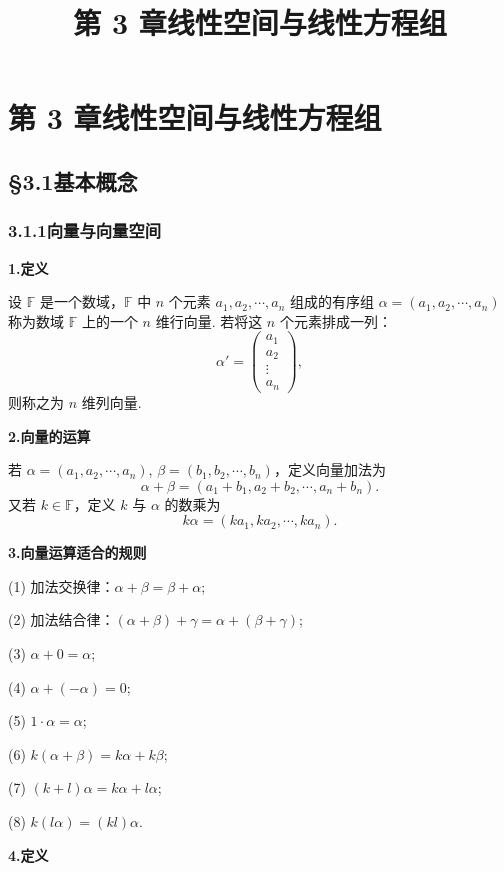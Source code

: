 \documentclass[UTF8,12pt,a4paper,fontset=fandol]{ctexart}
\title{第 3 章\quad 线性空间与线性方程组}
\author{}
\date{}
\begin{document}
\maketitle

\section*{第 3 章\quad 线性空间与线性方程组}

\subsection*{§3.1\quad 基本概念}

\subsubsection*{3.1.1\quad 向量与向量空间}

\noindent\textbf{1.\quad 定义}

设 $\mathbb{F}$ 是一个数域，$\mathbb{F}$ 中 $n$ 个元素 $a_1,a_2,\cdots,a_n$ 组成的有序组
$\alpha=(a_1,a_2,\cdots,a_n)$ 称为数域 $\mathbb{F}$ 上的一个 $n$ 维行向量. 若将这 $n$ 个元素排成一列：
\[
\alpha'=
\begin{pmatrix}
a_1\\
a_2\\
\vdots\\
a_n
\end{pmatrix},
\]
则称之为 $n$ 维列向量.

\noindent\textbf{2.\quad 向量的运算}

若 $\alpha=(a_1,a_2,\cdots,a_n)$, $\beta=(b_1,b_2,\cdots,b_n)$，定义向量加法为
\[
\alpha+\beta=(a_1+b_1,a_2+b_2,\cdots,a_n+b_n).
\]
又若 $k\in\mathbb{F}$，定义 $k$ 与 $\alpha$ 的数乘为
\[
k\alpha=(ka_1,ka_2,\cdots,ka_n).
\]

\noindent\textbf{3.\quad 向量运算适合的规则}

(1) 加法交换律：$\alpha+\beta=\beta+\alpha$;

(2) 加法结合律：$(\alpha+\beta)+\gamma=\alpha+(\beta+\gamma)$;

(3) $\alpha+0=\alpha$;

(4) $\alpha+(-\alpha)=0$;

(5) $1\cdot\alpha=\alpha$;

(6) $k(\alpha+\beta)=k\alpha+k\beta$;

(7) $(k+l)\alpha=k\alpha+l\alpha$;

(8) $k(l\alpha)=(kl)\alpha$.

\noindent\textbf{4.\quad 定义}
\end{document}
